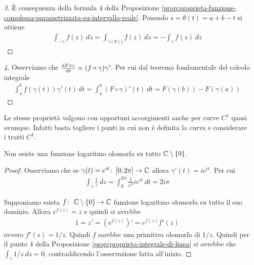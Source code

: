 \begin{proof}[3]
	È conseguenza della formula $4$ della Proposizione \ref{prop:proprieta-funzione-complessa-parametrizzata-su-intervallo-reale}. Ponendo $s = \theta(t) = a + b - t$ si ottiene
	\begin{equation*}
	\begin{aligned}
	\int_{-\gamma} f(z)\ dz = \int_{\gamma(\theta))} f(z)\ dz = -\int_{\gamma} f(z)\ dz
	\end{aligned}
	\end{equation*}
\end{proof}
\begin{proof}[4]
	Osserviamo che $\odv{F \circ \gamma}{t} = (f \circ \gamma) \gamma'$. Per cui dal teorema fondamentale del calcolo integrale
	\begin{equation*}
	\begin{aligned}
	\int^b_a f(\gamma(t))\gamma'(t)\ dt = \int_a^b (F \circ \gamma)'(t)\ dt = F(\gamma(b)) - F(\gamma(a))
	\end{aligned}
	\end{equation*}
\end{proof}

\begin{remark}
	Le stesse proprietà valgono con opportuni accorgimenti anche per curve $C^1$ quasi ovunque. Infatti basta togliere i punti in cui non è definita la curva e considerare i tratti $C^1$. 
\end{remark}

\begin{theorem}
	Non esiste una funzione logaritmo olomorfa su tutto $\mathbb{C} \setminus \{0\}$.
\end{theorem}
\begin{proof}
	Osserviamo che se $\gamma(t) = e^{it} \colon \left[0,2\pi\right] \to \mathbb{C}$ allora $\gamma'(t) = ie^{it}$. Per cui
	\begin{equation*}
	\begin{aligned}
	\int_\gamma \frac{1}{z}\ dz = \int_{0}^{2\pi} \frac{1}{e^{it}} ie^{it}\ dt = 2i\pi
	\end{aligned}
	\end{equation*}
	
	Supponiamo esista $f \colon\ \mathbb{C} \setminus \{0\} \rightarrow \mathbb{C}$ funzione logaritmo olomorfa su tutto il suo dominio. Allora $e^{f(z)} = z$ e quindi si avrebbe
	\begin{equation*}
	\begin{aligned}
	1 = z' =(e^{f(z)})' = e^{f(z)} f'(z) 
	\end{aligned}
	\end{equation*}
	ovvero $f'(z) = 1/z$. Quindi $f$ sarebbe una primitiva olomorfa di $1/z$. Quindi per il punto $4$ della Proposizione \ref{prop:proprieta-integrale-di-linea} si avrebbe che $\int_{\gamma} 1/z \ dz = 0$, contraddicendo l'osservazione fatta all'inizio. 
\end{proof}

